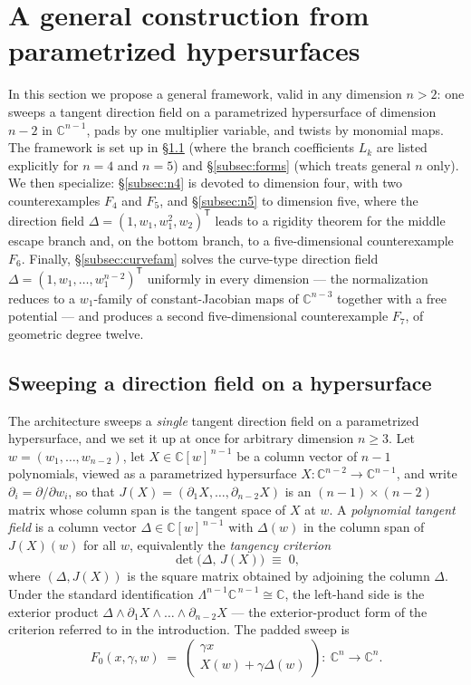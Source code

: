 \documentclass[11pt]{article}
\theoremstyle{plain}
\theoremstyle{definition}
\theoremstyle{remark}
\newcommand{\C}{\mathbb{C}}
\begin{document}
\section{A general construction from parametrized hypersurfaces}\label{sec:dim4}

In this section we propose a general framework, valid in any dimension $n>2$:
one sweeps a tangent direction field on a parametrized hypersurface of dimension
$n-2$ in $\C^{n-1}$, pads by one multiplier variable, and twists by monomial
maps. The framework is set up in \S\ref{subsec:sweephyp} (where the branch
coefficients $L_k$ are listed explicitly for $n=4$ and $n=5$) and
\S\ref{subsec:forms} (which treats general $n$ only). We then specialize:
\S\ref{subsec:n4} is devoted to dimension four, with two counterexamples
$F_4$ and $F_5$, and \S\ref{subsec:n5} to dimension five, where the direction
field $\Delta=(1,w_1,w_1^2,w_2)^{\mathsf T}$ leads to a rigidity theorem for the middle
escape branch and, on the bottom branch, to a five-dimensional counterexample
$F_6$. Finally, \S\ref{subsec:curvefam} solves the curve-type direction field
$\Delta=(1,w_1,\dots,w_1^{n-2})^{\mathsf T}$ uniformly in every dimension --- the
normalization reduces to a $w_1$-family of constant-Jacobian maps of
$\C^{n-3}$ together with a free potential --- and produces a second
five-dimensional counterexample $F_7$, of geometric degree twelve.

\subsection{Sweeping a direction field on a hypersurface}\label{subsec:sweephyp}
The architecture sweeps a \emph{single} tangent direction field on a
parametrized hypersurface, and we set it up at once for arbitrary dimension
$n\ge3$. Let $w=(w_1,\dots,w_{n-2})$, let $X\in\C[w]^{\,n-1}$ be a column vector
of $n-1$ polynomials, viewed as a parametrized hypersurface
$X\colon\C^{n-2}\to\C^{n-1}$, and write $\partial_i=\partial/\partial w_i$, so
that $J(X)=(\partial_1X,\dots,\partial_{n-2}X)$ is an
$(n-1)\times(n-2)$ matrix whose column span is the tangent space of $X$ at $w$.
A \emph{polynomial tangent field} is a column vector $\Delta\in\C[w]^{\,n-1}$
with $\Delta(w)$ in the column span of $J(X)(w)$ for all $w$, equivalently the
\emph{tangency criterion}
\begin{equation}\label{eq:tangcrit}
\det\bigl(\Delta,\,J(X)\bigr)\;\equiv\;0 ,
\end{equation}
where $(\Delta,J(X))$ is the square matrix obtained by adjoining the column
$\Delta$. Under the standard identification
$\Lambda^{n-1}\C^{\,n-1}\cong\C$, the left-hand side is the exterior product
$\Delta\wedge\partial_1X\wedge\dots\wedge\partial_{n-2}X$ --- the
exterior-product form of the criterion referred to in the introduction. The padded sweep is
\[
F_0(x,\gamma,w)\;=\;\begin{pmatrix}\gamma x\\ X(w)+\gamma\Delta(w)\end{pmatrix}\colon
\ \C^n\to\C^n .
\]
\end{document}
